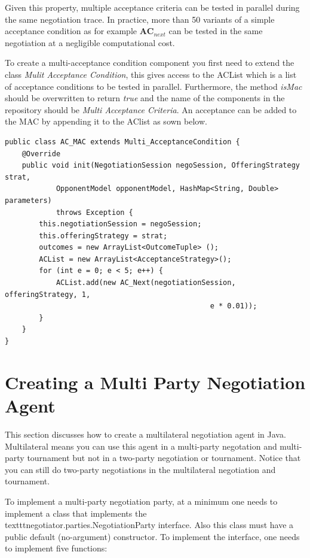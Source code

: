 \documentclass[]{article}
\begin{document}
Given this property, multiple acceptance criteria can be tested in parallel during the same negotiation trace. In practice, more than 50 variants of a simple acceptance condition as for example $\textbf{AC}_{next}$ can be tested in the same negotiation at a negligible computational cost.

To create a multi-acceptance condition component you first need to extend the class \textit{Mulit Acceptance Condition}, this gives access to the ACList which is a list of acceptance conditions to be tested in parallel. Furthermore, the method \textit{isMac} should be overwritten to return \textit{true} and the name of the components in the repository should be \textit{Multi Acceptance Criteria}. An acceptance can be added to the MAC by appending it to the AClist as sown below. 

\begin{lstlisting}
public class AC_MAC extends Multi_AcceptanceCondition {
	@Override
	public void init(NegotiationSession negoSession, OfferingStrategy strat, 
			OpponentModel opponentModel, HashMap<String, Double> parameters)
			throws Exception {
		this.negotiationSession = negoSession;
		this.offeringStrategy = strat;
		outcomes = new ArrayList<OutcomeTuple> ();
		ACList = new ArrayList<AcceptanceStrategy>();
		for (int e = 0; e < 5; e++) {
			ACList.add(new AC_Next(negotiationSession, offeringStrategy, 1, 
												e * 0.01));
		}
	}
}

\end{lstlisting}





\section{Creating a Multi Party Negotiation Agent}
This section discusses how to create a multilateral negotiation agent in Java. Multilateral means you can use this agent in a multi-party negotation and multi-party tournament but not in a two-party negotiation or tournament. Notice that you can still do two-party negotiations in the multilateral negotiation and tournament.

To implement a multi-party negotiation party, at a minimum one needs to implement a class that implements the \\texttt{negotiator.parties.NegotiationParty} interface. Also this class must have a public default (no-argument) constructor.
To implement the interface, one needs to implement five functions: 
\end{document}
